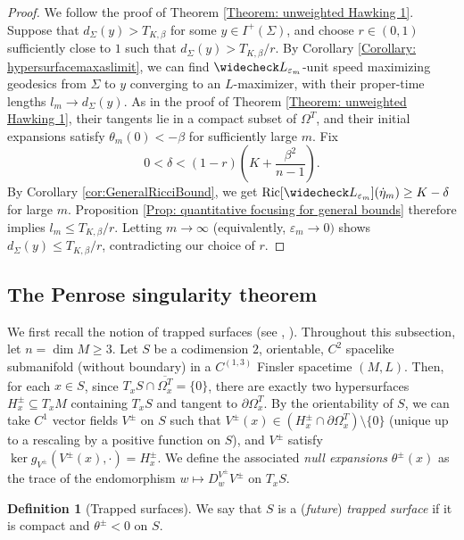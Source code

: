 \documentclass[a4paper,11pt]{article}
\numberwithin{equation}{section}
\theoremstyle{definition}
\newtheorem{Definition}{Definition}[section]
\theoremstyle{plain}
\newcommand{\Ric}{\mathrm{Ric}}
\begin{document}
\begin{proof}
We follow the proof of Theorem \ref{Theorem: unweighted Hawking 1}.
Suppose that $d_\Sigma(y)>T_{K,\beta}$ for some $y\in I^+(\Sigma)$, and choose $r\in(0,1)$ sufficiently close to $1$ such that $d_\Sigma(y)>T_{K,\beta}/r$.
By Corollary \ref{Corollary: hypersurfacemaxaslimit}, we can find $\widecheck L_{\varepsilon_m}$-unit speed maximizing geodesics from $\Sigma$ to $y$ converging to an $L$-maximizer, with their proper-time lengths $l_m\to d_\Sigma(y)$.
As in the proof of Theorem \ref{Theorem: unweighted Hawking 1}, their tangents lie in a compact subset of $\Omega^T$, and their initial expansions satisfy $\theta_m(0)<-\beta$ for sufficiently large $m$.
Fix
\[
    0<\delta<
    (1-r)\left(K+\frac{\beta^2}{n-1}\right).
\]
By Corollary \ref{cor:GeneralRicciBound}, we get $\Ric[\widecheck L_{\varepsilon_m}](\dot\eta_m)\geq K-\delta$ for large $m$.
Proposition \ref{Prop: quantitative focusing for general bounds} therefore implies $l_m\leq T_{K,\beta}/r$. 
Letting $m \to \infty$ (equivalently, $\varepsilon_m \to 0)$ shows $d_\Sigma(y) \leq T_{K,\beta}/r$, contradicting our choice of $r$.
\end{proof}

\subsection{The Penrose singularity theorem}\label{sc:Penrose}

We first recall the notion of trapped surfaces (see \cite[\S 4]{MinguzziRaychaudhuri}, \cite[\S 8.1]{LuMinguzziOhtaSingularity}). Throughout this subsection, let $n=\dim M \geq 3$.
Let $S$ be a codimension $2$, orientable, $C^2$ spacelike submanifold (without boundary) in a $C^{(1,3)}$ Finsler spacetime $(M,L)$. 
Then, for each $x \in S$, since $T_x S \cap \overline{\Omega_x^T}=\{0\}$, there are exactly two hypersurfaces $H_x^{\pm} \subseteq T_xM$ containing $T_x S$ and tangent to $\partial \Omega_x^T$. 
By the orientability of $S$, we can take $C^1$ vector fields $V^\pm$ on $S$ such that $V^\pm(x) \in (H_x^\pm \cap \partial \Omega_x^T) \setminus \{0\}$ (unique up to a rescaling by a positive function on $S$), and $V^\pm$ satisfy $\ker g_{V^\pm}(V^\pm(x),\cdot)=H_x^\pm$.
We define the associated \emph{null expansions} $\theta^\pm(x)$ as the trace of the endomorphism $w \mapsto D^{V^\pm}_wV^\pm$ on $T_xS$. 

\begin{Definition}[Trapped surfaces]
    We say that $S$ is a (\emph{future}) \emph{trapped surface} if it is compact and $\theta^\pm <0$ on $S$.
\end{Definition}
\end{document}
